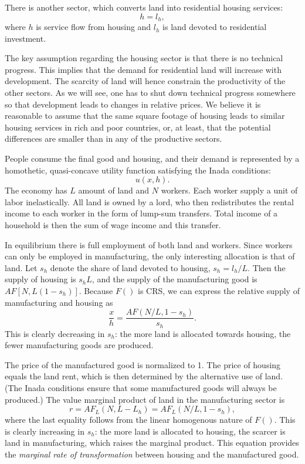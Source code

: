 \documentclass[12pt]{article}
\begin{document}
There is another sector, which converts land into residential housing services:
\[
h = l_h,
\]
where $h$ is service flow from housing and $l_h$ is land devoted to residential investment.

The key assumption regarding the housing sector is that there is no technical progress. This implies that the demand for residential land will increase with development. The scarcity of land will hence constrain the productivity of the other sectors. As we will see, one has to shut down technical progress somewhere so that development leads to changes in relative prices. We believe it is reasonable to assume that the same square footage of housing leads to similar housing services in rich and poor countries, or, at least, that the potential differences are smaller than in any of the productive sectors.

People consume the final good and housing, and their demand is represented by a homothetic, quasi-concave utility function satisfying the Inada conditions:
\[
u(x,h).
\]
The economy has $L$ amount of land and $N$ workers. Each worker supply a unit of labor inelastically. All land is owned by a lord, who then redistributes the rental income to each worker in the form of lump-sum transfers. Total income of a household is then the sum of wage income and this transfer.

In equilibrium there is full employment of both land and workers. Since workers can only be employed in manufacturing, the only interesting allocation is that of land. Let $s_h$ denote the share of land devoted to housing, $s_h = l_h/L$. Then the supply of housing is $s_h L$, and the supply of the manufacturing good is $AF[N,L(1-s_h)]$. Because $F()$ is CRS, we can express the relative supply of manufacturing and housing as
\[
\frac{x}{h} = \frac{AF(N/L,1-s_h)}{s_h}.
\]
This is clearly decreasing in $s_h$: the more land is allocated towards housing, the fewer manufacturing goods are produced.

The price of the manufactured good is normalized to 1. The price of housing equals the land rent, which is then determined by the alternative use of land. (The Inada conditions ensure that some manufactured goods will always be produced.) The value marginal product of land in the manufacturing sector is
\begin{equation}\label{eq:MRT}
r = AF_L(N,L-L_h) = AF_L(N/L,1-s_h),
\end{equation}
where the last equality follows from the linear homogenous nature of $F()$. This is clearly increasing in $s_h$: the more land is allocated to housing, the scarcer is land in manufacturing, which raises the marginal product. This equation provides the \emph{marginal rate of transformation} between housing and the manufactured good.
\end{document}

